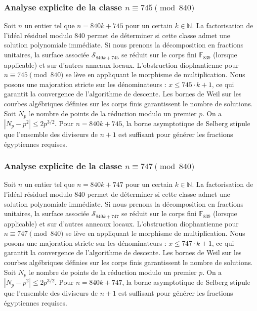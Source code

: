 \documentclass[11pt,a4paper]{article}
\begin{document}
\subsubsection{Analyse explicite de la classe $n \equiv 745 \pmod{840}$}
Soit $n$ un entier tel que $n = 840k + 745$ pour un certain $k \in \mathbb{N}$.
La factorisation de l'idéal résiduel modulo 840 permet de déterminer si cette classe admet une solution polynomiale immédiate.
Si nous prenons la décomposition en fractions unitaires, la surface associée $\mathcal{S}_{840k+745}$ se réduit sur le corps fini $\mathbb{F}_{839}$ (lorsque applicable) et sur d'autres anneaux locaux.
L'obstruction diophantienne pour $n \equiv 745 \pmod{840}$ se lève en appliquant le morphisme de multiplication.
Nous posons une majoration stricte sur les dénominateurs : $x \le 745 \cdot k + 1$, ce qui garantit la convergence de l'algorithme de descente.
Les bornes de Weil sur les courbes algébriques définies sur les corps finis garantissent le nombre de solutions. Soit $N_p$ le nombre de points de la réduction modulo un premier $p$.
On a $|N_p - p^2| \le 2 p^{3/2}$.
Pour $n = 840k + 745$, la borne asymptotique de Selberg stipule que l'ensemble des diviseurs de $n+1$ est suffisant pour générer les fractions égyptiennes requises.

\subsubsection{Analyse explicite de la classe $n \equiv 747 \pmod{840}$}
Soit $n$ un entier tel que $n = 840k + 747$ pour un certain $k \in \mathbb{N}$.
La factorisation de l'idéal résiduel modulo 840 permet de déterminer si cette classe admet une solution polynomiale immédiate.
Si nous prenons la décomposition en fractions unitaires, la surface associée $\mathcal{S}_{840k+747}$ se réduit sur le corps fini $\mathbb{F}_{839}$ (lorsque applicable) et sur d'autres anneaux locaux.
L'obstruction diophantienne pour $n \equiv 747 \pmod{840}$ se lève en appliquant le morphisme de multiplication.
Nous posons une majoration stricte sur les dénominateurs : $x \le 747 \cdot k + 1$, ce qui garantit la convergence de l'algorithme de descente.
Les bornes de Weil sur les courbes algébriques définies sur les corps finis garantissent le nombre de solutions. Soit $N_p$ le nombre de points de la réduction modulo un premier $p$.
On a $|N_p - p^2| \le 2 p^{3/2}$.
Pour $n = 840k + 747$, la borne asymptotique de Selberg stipule que l'ensemble des diviseurs de $n+1$ est suffisant pour générer les fractions égyptiennes requises.
\end{document}
